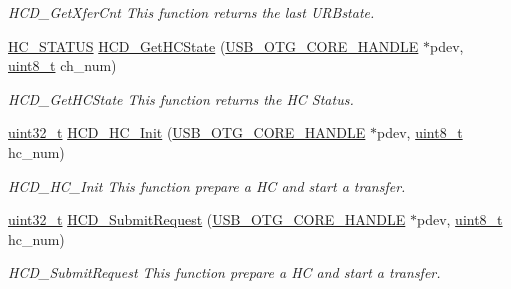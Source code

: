 \begin{DoxyCompactItemize}
\begin{DoxyCompactList}\small\item\em H\-C\-D\-\_\-\-Get\-Xfer\-Cnt This function returns the last U\-R\-Bstate. \end{DoxyCompactList}\item 
\hyperlink{group___u_s_b___c_o_r_e___exported___types_gaa3b5cdc33c598d3e76e186f3b6ae5cd3}{H\-C\-\_\-\-S\-T\-A\-T\-U\-S} \hyperlink{group___u_s_b___h_c_d___private___functions_gae346a15d3639b390b6a745f04dae3a39}{H\-C\-D\-\_\-\-Get\-H\-C\-State} (\hyperlink{group___u_s_b___c_o_r_e___exported___types_gaf76054c11eb8a3367907aad7ae700e80}{U\-S\-B\-\_\-\-O\-T\-G\-\_\-\-C\-O\-R\-E\-\_\-\-H\-A\-N\-D\-L\-E} $\ast$pdev, \hyperlink{stdint_8h_aba7bc1797add20fe3efdf37ced1182c5}{uint8\-\_\-t} ch\-\_\-num)
\begin{DoxyCompactList}\small\item\em H\-C\-D\-\_\-\-Get\-H\-C\-State This function returns the H\-C Status. \end{DoxyCompactList}\item 
\hyperlink{stdint_8h_a435d1572bf3f880d55459d9805097f62}{uint32\-\_\-t} \hyperlink{group___u_s_b___h_c_d___private___functions_ga1e1685e970b86a17b7b31ab9a14ad1c2}{H\-C\-D\-\_\-\-H\-C\-\_\-\-Init} (\hyperlink{group___u_s_b___c_o_r_e___exported___types_gaf76054c11eb8a3367907aad7ae700e80}{U\-S\-B\-\_\-\-O\-T\-G\-\_\-\-C\-O\-R\-E\-\_\-\-H\-A\-N\-D\-L\-E} $\ast$pdev, \hyperlink{stdint_8h_aba7bc1797add20fe3efdf37ced1182c5}{uint8\-\_\-t} hc\-\_\-num)
\begin{DoxyCompactList}\small\item\em H\-C\-D\-\_\-\-H\-C\-\_\-\-Init This function prepare a H\-C and start a transfer. \end{DoxyCompactList}\item 
\hyperlink{stdint_8h_a435d1572bf3f880d55459d9805097f62}{uint32\-\_\-t} \hyperlink{group___u_s_b___h_c_d___private___functions_gad07e6e0a136a94695425c6663d7ce5f2}{H\-C\-D\-\_\-\-Submit\-Request} (\hyperlink{group___u_s_b___c_o_r_e___exported___types_gaf76054c11eb8a3367907aad7ae700e80}{U\-S\-B\-\_\-\-O\-T\-G\-\_\-\-C\-O\-R\-E\-\_\-\-H\-A\-N\-D\-L\-E} $\ast$pdev, \hyperlink{stdint_8h_aba7bc1797add20fe3efdf37ced1182c5}{uint8\-\_\-t} hc\-\_\-num)
\begin{DoxyCompactList}\small\item\em H\-C\-D\-\_\-\-Submit\-Request This function prepare a H\-C and start a transfer. \end{DoxyCompactList}\end{DoxyCompactItemize}


